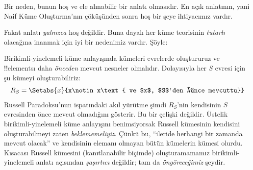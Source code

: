 Bir neden, bunun hoş ve ele alınabilir bir anlatı olmasıdır. En açık
anlatının, yani Naif Küme Oluşturma'nın çöküşünden sonra hoş bir şeye
ihtiyacımız vardır.

Fakat anlatı \emph{yalnızca} hoş değildir. Buna dayalı her küme teorisinin
\emph{tutarlı} olacağına inanmak için iyi bir nedenimiz vardır. Şöyle:

Birikimli-yinelemeli küme anlayışında kümeleri evrelerde oluştururuz ve
!!{element}s{}ı daha \emph{önceden} mevcut nesneler olmalıdır. Dolayısıyla her
$S$ evresi için şu kümeyi oluşturabiliriz:
\[
  R_S=\Setabs{x}{x\notin x\text{ ve $x$, $S$'den önce mevcuttu}}
\]
Russell Paradoksu'nun ispatındaki akıl yürütme şimdi $R_S$'nin kendisinin
$S$ evresinden önce mevcut olmadığını gösterir. Bu bir çelişki değildir.
Üstelik birikimli-yinelemeli küme anlayışını benimsiyorsak Russell kümesinin
kendisini oluşturabilmeyi zaten \emph{beklememeliyiz}. Çünkü bu, ``ileride
herhangi bir zamanda mevcut olacak'' ve kendisinin elemanı olmayan bütün
kümelerin kümesi olurdu. Kısacası Russell kümesini (kanıtlanabilir biçimde)
oluşturamamamız birikimli-yinelemeli anlatı açısından \emph{şaşırtıcı}
değildir; tam da \emph{öngöreceğimiz} şeydir.

%


